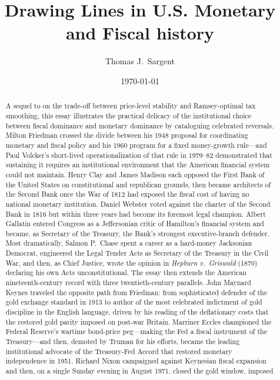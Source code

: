 \documentclass[12pt]{article}
\title{Drawing Lines in U.S. Monetary and Fiscal history}
\author{Thomas J.~Sargent}
\date{\today}
\begin{document}
\maketitle

\begin{abstract}
A sequel to \citet{Sargent2011} on the trade-off between price-level
stability and Ramsey-optimal tax smoothing, this essay illustrates the
practical delicacy of the institutional choice between fiscal dominance
and monetary dominance by cataloguing celebrated reversals.  Milton
Friedman crossed the divide between his 1948 proposal for coordinating
monetary and fiscal policy and his 1960 program for a fixed money-growth
rule---and Paul Volcker's short-lived operationalization of that rule in
1979--82 demonstrated that sustaining it requires an institutional
environment that the American financial system could not maintain.
Henry Clay and James Madison each opposed the First Bank of the
United States on constitutional and republican grounds, then became
architects of the Second Bank once the War of 1812 had exposed the
fiscal cost of having no national monetary institution.
Daniel Webster voted against the charter of the Second Bank in 1816 but
within three years had become its foremost legal champion.  Albert
Gallatin entered Congress as a Jeffersonian critic of Hamilton's financial
system and became, as Secretary of the Treasury, the Bank's strongest
executive-branch defender.  Most dramatically, Salmon P.\ Chase spent a
career as a hard-money Jacksonian Democrat, engineered the Legal Tender
Acts as Secretary of the Treasury in the Civil War, and then, as Chief
Justice, wrote the opinion in \textit{Hepburn v.\ Griswold} (1870)
declaring his own Acts unconstitutional.  The essay then extends the
American nineteenth-century record with three twentieth-century
parallels.  John Maynard Keynes traveled the opposite path from
Friedman: from sophisticated defender of the gold exchange standard in
1913 to author of the most celebrated indictment of gold discipline in
the English language, driven by his reading of the deflationary costs
that the restored gold parity imposed on post-war Britain.  Marriner
Eccles championed the Federal Reserve's wartime bond-price peg---making
the Fed a fiscal instrument of the Treasury---and then, demoted by
Truman for his efforts, became the leading institutional advocate of the
Treasury-Fed Accord that restored monetary independence in 1951.  Richard
Nixon campaigned against Keynesian fiscal expansion and then, on a single
Sunday evening in August 1971, closed the gold window, imposed

\end{abstract}
\end{document}
